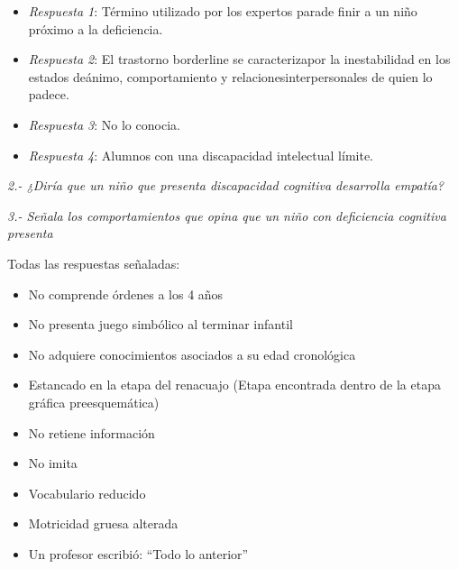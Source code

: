 \documentclass[letterpaper,12pt]{article}
\begin{document}
\begin{itemize}
\item \emph{Respuesta 1}: Término utilizado por los expertos parade finir a un niño próximo a la deficiencia. \\
\item \emph{Respuesta 2}: El trastorno borderline se caracterizapor la inestabilidad en los estados deánimo, comportamiento y relacionesinterpersonales de quien lo padece.\\
\item \emph{Respuesta 3}: No lo conocia. \\
\item \emph{Respuesta 4}: Alumnos con una discapacidad intelectual límite. \\
\end{itemize}

\newpage
\begin{flushleft}
\textit{2.- ¿Diría que un niño que presenta discapacidad cognitiva desarrolla empatía?}\\
\end{flushleft}
\begin{center}
\end{center}

\begin{flushleft}
\textit{3.- Señala los comportamientos que opina que un niño con deficiencia cognitiva presenta}\\
\end{flushleft}
Todas las respuestas señaladas:

\begin{itemize}
\item No comprende órdenes a los 4 años
\item No presenta juego simbólico al terminar infantil
\item No adquiere conocimientos asociados a su edad cronológica
\item Estancado en la etapa del renacuajo (Etapa encontrada dentro de la etapa gráfica preesquemática)
\item No retiene información
\item No imita
\item Vocabulario reducido
\item Motricidad gruesa alterada
\item Un profesor escribió: ``Todo lo anterior''
\end{itemize}
\end{document}
